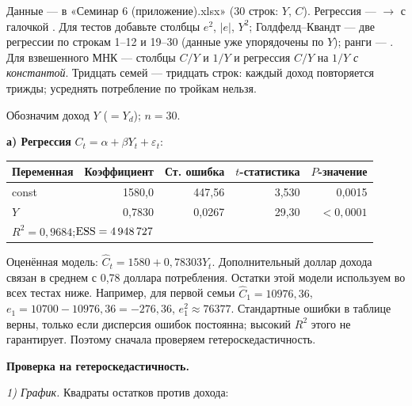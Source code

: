 \begin{excel}
Данные — в «Семинар 6 (приложение).xlsx» (30 строк: $Y$, $C$). Регрессия —
 $\to$  с галочкой . Для тестов
добавьте столбцы $e^2$, $|e|$, $Y^2$; Голдфелд--Квандт — две регрессии по
строкам 1--12 и 19--30 (данные уже упорядочены по $Y$); ранги —
. Для взвешенного МНК — столбцы $C/Y$ и $1/Y$ и регрессия
$C/Y$ на $1/Y$ \emph{с константой}. Тридцать семей — тридцать
строк: каждый доход повторяется трижды; усреднять потребление по тройкам нельзя.
\end{excel}

\begin{solution}
Обозначим доход $Y$ ($= Y_d$); $n = 30$.

\medskip
\textbf{а) Регрессия} $C_t = \alpha + \beta Y_t + \varepsilon_t$:
\begin{center}
\begin{tabular}{lrrrr}
\toprule
Переменная & Коэффициент & Ст. ошибка & $t$-статистика & $P$-значение \\
\midrule
const & 1580,0 & 447,56 & 3,530 & 0,0015 \\
$Y$   & 0,7830 & 0,0267 & 29,30 & $<0{,}0001$ \\
\midrule
\multicolumn{5}{l}{$R^2 = 0{,}9684$;\quad $\mathrm{ESS} = 4\,948\,727$} \\
\bottomrule
\end{tabular}
\end{center}
Оценённая модель: $\widehat C_t=1580+0{,}78303Y_t$.
Дополнительный доллар дохода связан в среднем с 0,78 доллара потребления.
Остатки этой модели используем во всех тестах ниже. Например, для первой
семьи $\widehat C_1=10976{,}36$, $e_1=10700-10976{,}36=-276{,}36$,
$e_1^2\approx76377$. Стандартные ошибки в таблице верны, только если
дисперсия ошибок постоянна; высокий $R^2$ этого не гарантирует. Поэтому
сначала проверяем гетероскедастичность.

\medskip
\textbf{Проверка на гетероскедастичность.}

\smallskip
\noindent\begin{minipage}{\linewidth}
\emph{1) График.} Квадраты остатков против дохода:
\begin{center}


\end{center}
\end{minipage}
\end{solution}
